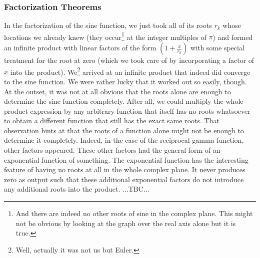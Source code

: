 \subsubsection{Factorization Theorems}
In the factorization of the sine function, we just took all of its roots $r_k$ whose locations we already knew (they occur\footnote{And there are indeed no other roots of sine in the complex plane. This might not be obvious by looking at the graph over the real axis alone but it is true.} at the integer multiples of $\pi$) and formed an infinite product with linear factors of the form $(1 + \frac{x}{r_k})$ with some special treatment for the root at zero (which we took care of by incorporating a factor of $x$ into the product). We\footnote{Well, actually it was not us but Euler.} arrived at an infinite product that indeed did converge to the sine function. We were rather lucky that it worked out so easily, though. At the outset, it was not at all obvious that the roots alone are enough to determine the sine function completely. After all, we could multiply the whole product expression by any arbitrary function that itself has no roots whatsoever to obtain a different function that still has the exact same roots. That observation hints at that the roots of a function alone might not be enough to determine it completely. Indeed, in the case of the reciprocal gamma function, other factors appeared. These other factors had the general form of an exponential function of something. The exponential function has the interesting feature of having no roots at all in the whole complex plane. It never produces zero as output such that these additional exponential factors do not introduce any additional roots into the product. ...TBC...




